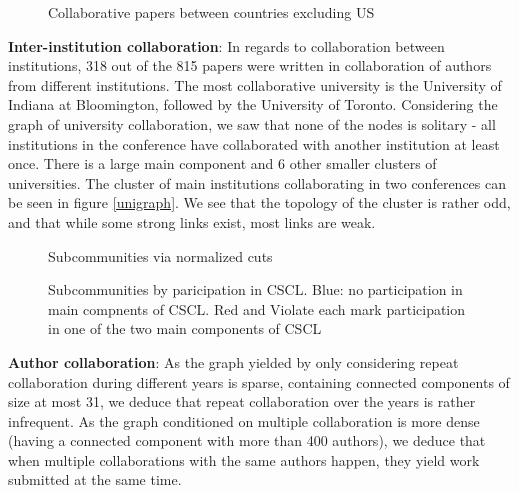 \documentclass[article,twocolumn]{IEEEtran}
\begin{document}
    \begin{figure}
        \begin{center}\end{center}
        \caption{Collaborative papers between countries excluding US}
        \label{figcollab}
    \end{figure}
    
    \textbf{Inter-institution collaboration}: In regards to collaboration
between institutions, 318 out of the 815 papers were written in
collaboration of authors from different institutions. The most
collaborative university is the University of Indiana at Bloomington,
followed by the University of Toronto. Considering the graph of
university collaboration, we saw that none of the nodes is solitary -
all institutions in the conference have collaborated with another
institution at least once. There is a large main component and 6 other
smaller clusters of universities. The cluster of main institutions
collaborating in two conferences can be seen in figure \ref{unigraph}.
We see that the topology of the cluster is rather odd, and that while
some strong links exist, most links are weak.


    \begin{figure}
        \begin{center}\end{center}
        \caption{Subcommunities via normalized cuts}
        \label{normalized}
    \end{figure}
    

    \begin{figure}
        \begin{center}\end{center}
        \caption{Subcommunities by paricipation in CSCL. Blue: no participation in main compnents of CSCL. Red and Violate each mark participation in one of the two main components of CSCL}
        \label{CSCL_components}
    \end{figure}
    
    \textbf{Author collaboration}: As the graph yielded by only considering
repeat collaboration during different years is sparse, containing
connected components of size at most 31, we deduce that repeat
collaboration over the years is rather infrequent. As the graph
conditioned on multiple collaboration is more dense (having a connected
component with more than 400 authors), we deduce that when multiple
collaborations with the same authors happen, they yield work submitted
at the same time.
\end{document}
